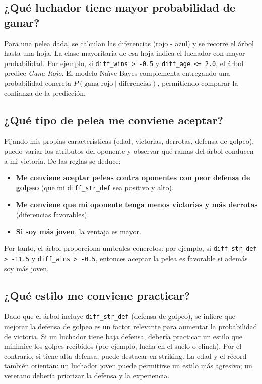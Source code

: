 \documentclass[11pt,a4paper]{article}
\begin{document}
\subsection{¿Qué luchador tiene mayor probabilidad de ganar?}
Para una pelea dada, se calculan las diferencias (rojo - azul) y se recorre el árbol hasta una hoja. La clase mayoritaria de esa hoja indica el luchador con mayor probabilidad. Por ejemplo, si \texttt{diff\_wins > -0.5} y \texttt{diff\_age <= 2.0}, el árbol predice \textit{Gana Rojo}. El modelo Naïve Bayes complementa entregando una probabilidad concreta $P(\text{gana rojo} \mid \text{diferencias})$, permitiendo comparar la confianza de la predicción.

\subsection{¿Qué tipo de pelea me conviene aceptar?}
Fijando mis propias características (edad, victorias, derrotas, defensa de golpeo), puedo variar los atributos del oponente y observar qué ramas del árbol conducen a mi victoria. De las reglas se deduce:
\begin{itemize}
    \item \textbf{Me conviene aceptar peleas contra oponentes con peor defensa de golpeo} (que mi \texttt{diff\_str\_def} sea positivo y alto).
    \item \textbf{Me conviene que mi oponente tenga menos victorias y más derrotas} (diferencias favorables).
    \item \textbf{Si soy más joven}, la ventaja es mayor.
\end{itemize}
Por tanto, el árbol proporciona umbrales concretos: por ejemplo, si \texttt{diff\_str\_def > -11.5} y \texttt{diff\_wins > -0.5}, entonces aceptar la pelea es favorable si además soy más joven.

\subsection{¿Qué estilo me conviene practicar?}
Dado que el árbol incluye \texttt{diff\_str\_def} (defensa de golpeo), se infiere que mejorar la defensa de golpeo es un factor relevante para aumentar la probabilidad de victoria. Si un luchador tiene baja defensa, debería practicar un estilo que minimice los golpes recibidos (por ejemplo, lucha en el suelo o clinch). Por el contrario, si tiene alta defensa, puede destacar en striking. La edad y el récord también orientan: un luchador joven puede permitirse un estilo más agresivo; un veterano debería priorizar la defensa y la experiencia.
\end{document}

